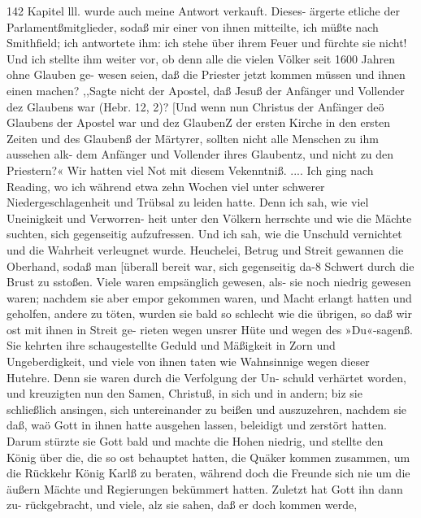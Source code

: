 142 Kapitel lll.
wurde auch meine Antwort verkauft. Dieses- ärgerte etliche der
Parlamentßmitglieder, sodaß mir einer von ihnen mitteilte, ich
müßte nach Smithfield; ich antwortete ihm: ich stehe über ihrem
Feuer und fürchte sie nicht! Und ich stellte ihm weiter vor, ob
denn alle die vielen Völker seit 1600 Jahren ohne Glauben ge-
wesen seien, daß die Priester jetzt kommen müssen und ihnen einen
machen? ,,Sagte nicht der Apostel, daß Jesuß der Anfänger und
Vollender dez Glaubens war (Hebr. 12, 2)? [Und wenn nun
Christus der Anfänger deö Glaubens der Apostel war und dez
GlaubenZ der ersten Kirche in den ersten Zeiten und des Glaubenß
der Märtyrer, sollten nicht alle Menschen zu ihm aussehen alk-
dem Anfänger und Vollender ihres Glaubentz, und nicht zu den
Priestern?« Wir hatten viel Not mit diesem Vekenntniß. ....
Ich ging nach Reading, wo ich während etwa zehn Wochen
viel unter schwerer Niedergeschlagenheit und Trübsal zu leiden
hatte. Denn ich sah, wie viel Uneinigkeit und Verworren-
heit unter den Völkern herrschte und wie die Mächte suchten, sich
gegenseitig aufzufressen. Und ich sah, wie die Unschuld vernichtet
und die Wahrheit verleugnet wurde. Heuchelei, Betrug und
Streit gewannen die Oberhand, sodaß man [überall bereit war,
sich gegenseitig da-8 Schwert durch die Brust zu sstoßen. Viele
waren empsänglich gewesen, als- sie noch niedrig gewesen waren;
nachdem sie aber empor gekommen waren, und Macht erlangt
hatten und geholfen, andere zu töten, wurden sie bald so
schlecht wie die übrigen, so daß wir ost mit ihnen in Streit ge-
rieten wegen unsrer Hüte und wegen des »Du«-sagenß. Sie
kehrten ihre schaugestellte Geduld und Mäßigkeit in Zorn und
Ungeberdigkeit, und viele von ihnen taten wie Wahnsinnige wegen
dieser Hutehre. Denn sie waren durch die Verfolgung der Un-
schuld verhärtet worden, und kreuzigten nun den Samen,
Christuß, in sich und in andern; biz sie schließlich ansingen, sich
untereinander zu beißen und auszuzehren, nachdem sie daß, waö
Gott in ihnen hatte ausgehen lassen, beleidigt und zerstört hatten.
Darum stürzte sie Gott bald und machte die Hohen niedrig, und
stellte den König über die, die so ost behauptet hatten, die Quäker
kommen zusammen, um die Rückkehr König Karlß zu beraten,
während doch die Freunde sich nie um die äußern Mächte und
Regierungen bekümmert hatten. Zuletzt hat Gott ihn dann zu-
rückgebracht, und viele, alz sie sahen, daß er doch kommen werde,


